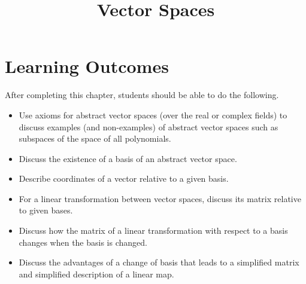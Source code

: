 \documentclass{ximera}
\title{Vector Spaces}
\begin{document}
\begin{abstract}

\end{abstract}
 
\maketitle
 
\section*{Learning Outcomes}
After completing this chapter, students should be able to do the following.
 
\begin{itemize}
    \item Use axioms for abstract vector spaces (over the real or complex fields) to discuss examples (and non-examples) of abstract vector spaces such as subspaces of the space of all polynomials.
    \item Discuss the existence of a basis of an abstract vector space. 
    \item Describe coordinates of a vector relative to a given basis. 
    \item For a linear transformation between vector spaces, discuss its matrix relative to given bases. 
    \item Discuss how the matrix of a linear transformation with respect to a basis changes when the basis is changed.
    \item Discuss the advantages of a change of basis that leads to a simplified matrix and simplified description of a linear map.

 
\end{itemize}

 
\end{document}

